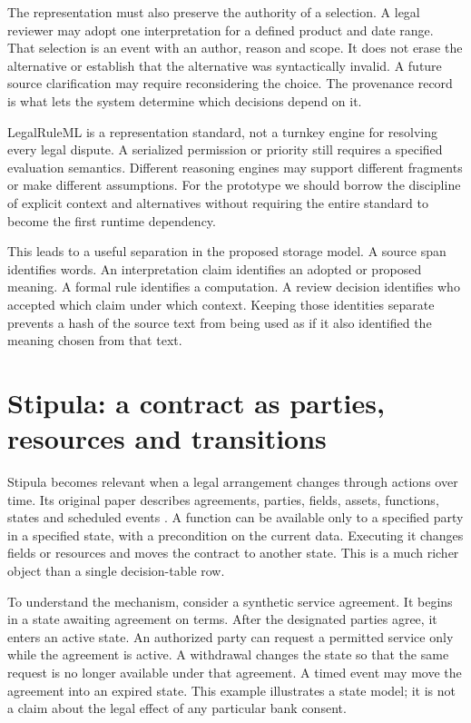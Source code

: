
The representation must also preserve the authority of a selection. A legal
reviewer may adopt one interpretation for a defined product and date range.
That selection is an event with an author, reason and scope. It does not erase
the alternative or establish that the alternative was syntactically invalid.
A future source clarification may require reconsidering the choice. The
provenance record is what lets the system determine which decisions depend on it.

LegalRuleML is a representation standard, not a turnkey engine for resolving
every legal dispute. A serialized permission or priority still requires a
specified evaluation semantics. Different reasoning engines may support
different fragments or make different assumptions. For the prototype we should
borrow the discipline of explicit context and alternatives without requiring
the entire standard to become the first runtime dependency.

This leads to a useful separation in the proposed storage model. A source span
identifies words. An interpretation claim identifies an adopted or proposed
meaning. A formal rule identifies a computation. A review decision identifies
who accepted which claim under which context. Keeping those identities
separate prevents a hash of the source text from being used as if it also
identified the meaning chosen from that text.

\section{Stipula: a contract as parties, resources and transitions}
\label{merge:M04:05}

\label{sec:languages-stipula}
Stipula becomes relevant when a legal arrangement changes through actions over
time. Its original paper describes agreements, parties, fields, assets,
functions, states and scheduled events \citep[secs.~3--6]{stipula2021}. A
function can be available only to a specified party in a specified state, with
a precondition on the current data. Executing it changes fields or resources
and moves the contract to another state. This is a much richer object than
a single decision-table row.

To understand the mechanism, consider a synthetic service agreement. It begins
in a state awaiting agreement on terms. After the designated parties agree,
it enters an active state. An authorized party can request a permitted service
only while the agreement is active. A withdrawal changes the state so that
the same request is no longer available under that agreement. A timed event
may move the agreement into an expired state. This example illustrates a state
model; it is not a claim about the legal effect of any particular bank consent.


